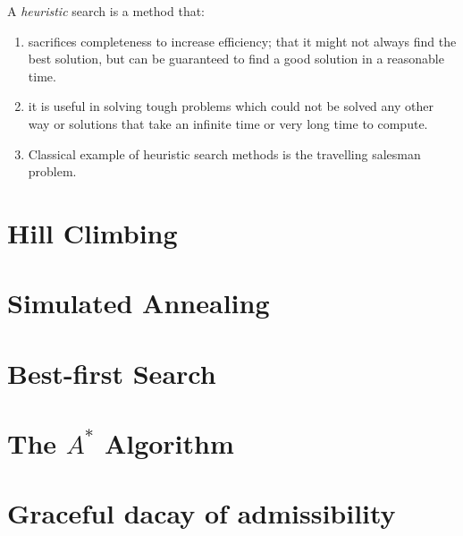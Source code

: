 \documentclass[../main.tex]{subfiles}
\begin{document}
A \textit{heuristic} search is a method that:
\begin{enumerate}
    \item sacrifices completeness to increase efficiency; that it might not always find the best solution, but can be guaranteed to find a good solution in a reasonable time. 
    \item it is useful in solving tough problems which could not be solved any other way or solutions that take an infinite time or very long time to compute.
    \item Classical example of heuristic search methods is the travelling salesman problem. 
    
\end{enumerate}
\section{Hill Climbing}
\section{Simulated Annealing}
\section{Best-first Search}
\section{The $A^{*}$ Algorithm}
\section{Graceful dacay of admissibility}
\end{document}
